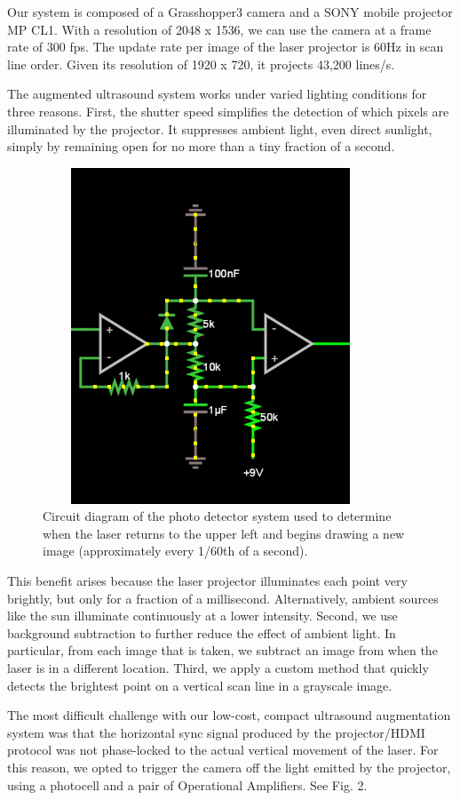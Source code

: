 \documentclass{llncs}
\begin{document}
Our system is composed of a Grasshopper3 camera and a SONY mobile projector MP CL1. With a resolution of 2048 x 1536, we can use the camera at a frame rate of 300 fps. The update rate per image of the laser projector is 60Hz in scan line order. Given its resolution of 1920 x 720, it projects 43,200 lines/s.

The augmented ultrasound system works under varied lighting conditions for three reasons. First, the shutter speed simplifies the detection of which pixels are illuminated by the projector. It suppresses ambient light, even direct sunlight, simply by remaining open for no more than a tiny fraction of a second.

\begin{figure}
\centering
\includegraphics[width=10cm,height=10cm,keepaspectratio]{circuit}
\caption{
Circuit diagram of the photo detector system used to determine when the laser returns to the upper left and begins drawing a new image (approximately every 1/60th of a second).
}
\end{figure}
This benefit arises because the laser projector illuminates each point very brightly, but only for a fraction of a millisecond. Alternatively, ambient sources like the sun illuminate continuously at a lower intensity. Second, we use background subtraction to further reduce the effect of ambient light. In particular, from each image that is taken, we subtract an image from when the laser is in a different location.  Third, we apply a custom method that quickly detects the brightest point on a vertical scan line in a grayscale image.

The most difficult challenge with our low-cost, compact ultrasound augmentation system was that the horizontal sync signal produced by the projector/HDMI protocol was not phase-locked to the actual vertical movement of the laser. For this reason, we opted to trigger the camera off the light emitted by the projector, using a photocell and a pair of Operational Amplifiers.  See Fig. 2.
\end{document}
